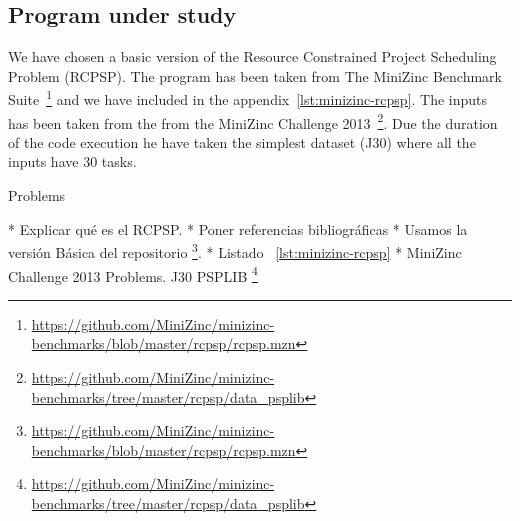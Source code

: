 \subsection{Program under study}
We have chosen a basic version of the Resource Constrained Project Scheduling
Problem (RCPSP). The program has been taken from The MiniZinc
Benchmark Suite~\footnote{\url{https://github.com/MiniZinc/minizinc-benchmarks/blob/master/rcpsp/rcpsp.mzn}}
and we have included in the appendix~\ref{lst:minizinc-rcpsp}.
The inputs has been taken from the from the MiniZinc Challenge
2013~\footnote{\url{https://github.com/MiniZinc/minizinc-benchmarks/tree/master/rcpsp/data_psplib}}. Due
the duration of the code execution he have taken the simplest dataset
(J30) where all the inputs have 30 tasks.

Problems

* Explicar qué es el RCPSP.
* Poner referencias bibliográficas
  \cite{BOFILL2020106777,  DING2023104958}
* Usamos la versión Básica del repositorio
\footnote{\url{https://github.com/MiniZinc/minizinc-benchmarks/blob/master/rcpsp/rcpsp.mzn}}.
* Listado ~\ref{lst:minizinc-rcpsp}
* MiniZinc Challenge 2013 Problems. J30 PSPLIB
\footnote{\url{https://github.com/MiniZinc/minizinc-benchmarks/tree/master/rcpsp/data_psplib}} \cite{KOLISCH1997205}

